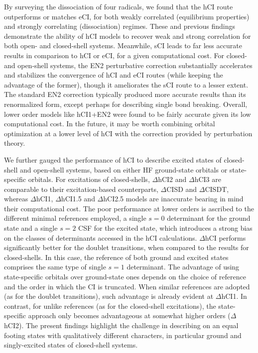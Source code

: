 \documentclass[aip,jcp,reprint,noshowkeys,superscriptaddress]{revtex4-1}
\begin{document}
By surveying the dissociation of four radicals,
we found that the hCI route outperforms or matches eCI, for both weakly correlated (equilibrium properties) and strongly correlating (dissociation) regimes.
These and previous \cite{Kossoski_2022} findings demonstrate the ability of hCI models to recover weak and strong correlation for both open- and closed-shell systems.
Meanwhile, sCI leads to far less accurate results in comparison to hCI or eCI, for a given computational cost.
For closed- and open-shell systems, the EN2 perturbative correction
substantially accelerates and stabilizes the convergence of hCI and eCI routes (while keeping the advantage of the former),
though it ameliorates the sCI route to a lesser extent.
The standard EN2 correction typically produced more accurate results than its renormalized form, except perhaps for describing single bond breaking.
Overall, lower order models like hCI1+EN2 were found to be fairly accurate given its low computational cost.
In the future, it may be worth combining orbital optimization at a lower level of hCI \cite{Kossoski_2022} with the correction provided by perturbation theory.

We further gauged the performance of hCI to describe excited states of closed-shell and open-shell systems, based on either HF ground-state orbitals or state-specific orbitals.
For excitations of closed-shells, $\Delta$hCI2 and $\Delta$hCI3 are comparable to their excitation-based counterparts, $\Delta$CISD and $\Delta$CISDT,
whereas $\Delta$hCI1, $\Delta$hCI1.5 and $\Delta$hCI2.5 models are inaccurate bearing in mind their computational cost.
The poor performance at lower orders is ascribed to the different minimal references employed,
a single $s=0$ determinant for the ground state and a single $s=2$ CSF for the excited state,
which introduces a strong bias on the classes of determinants accessed in the hCI calculations.
$\Delta$hCI performs significantly better for the doublet transitions, when compared to the results for closed-shells.
In this case, the reference of both ground and excited states comprises the same type of single $s=1$ determinant.
The advantage of using state-specific orbitals over ground-state ones depends on the choice of reference and the order in which the CI is truncated.
When similar references are adopted (as for the doublet transitions), such advantage is already evident at $\Delta$hCI1.
In contrast, for unlike references (as for the closed-shell excitations), the state-specific approach only becomes advantageous at somewhat higher orders ($\Delta$hCI2).
The present findings highlight the challenge in describing on an equal footing states with qualitatively different characters, in particular ground and singly-excited states of closed-shell systems.
\end{document}
